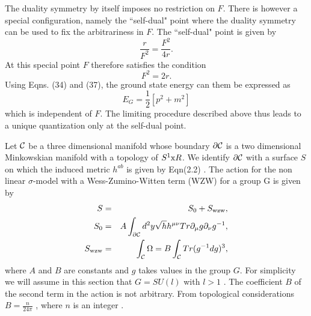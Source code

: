 \documentclass[a4paper,12pt]{article}
\let\oldtheequation=\theequation
\def\doteqs#1{\setcounter{equation}{0}
            \def\theequation{{#1}.\oldtheequation}}
\newcounter{sxn}
\def\sx#1{\addtocounter{sxn}{1} \bigskip\medskip \goodbreak
\noindent{\large\bf
\centerline{\thesxn.~~#1}} \nobreak \medskip}
\def\sxn#1{\sx{#1} \doteqs{\thesxn}}
\begin{document}
The duality symmetry by itself imposes no restriction on $F$.
 There is however a special configuration,
namely the ``self-dual" point where the duality symmetry can be used to
fix the arbitrariness in $F$. The ``self-dual" point is given by
\begin{equation}
\frac{r}{F^2} = \frac{F^2}{4 r}.
\end{equation}
At this special point $F$ therefore satisfies the condition
\begin{equation}
F^2 = 2 r.
\end{equation}
Using Eqns. (34) and (37), the ground state energy can them be expressed as 
\begin{equation}
E_G=\frac{1}{2}[p^2 + m^2]
\end{equation}
which is independent of $F$.
The limiting procedure described above thus leads to a unique 
quantization only at the self-dual point.


\sxn{Non Linear ${\sigma}$ - Model}

Let ${\cal C} $ be a three dimensional manifold whose boundary 
$ {{\partial}{\cal C}} $ is a two dimensional Minkowskian manifold with
a topology of $S^1 {\rm x} R$. We identify $ {{\partial}{\cal C}} $ 
with a surface $S$ on which the induced metric $h^{ab}$ is given by Eqn(2.2) . 
The action for the non linear $\sigma$-model with a
Wess-Zumino-Witten term (WZW) \cite{witten}  for a group G is given by
\begin{eqnarray}
S&=&S_0+S_{\rm wzw},\nonumber\\
S_0&=&A\int_{{\partial}{\cal C}} d^2y 
{\sqrt{h}}h^{{\mu}{\nu}}Tr{\partial}_{\mu} g {\partial}_{\nu}g^{-1},\nonumber\\
S_{\rm wzw}&=&\int_{\cal C}{\Omega}=B \int_{\cal C} Tr(g^{-1}dg)^3,
\end{eqnarray} 
where $A$ and $B$ are constants and $g$ takes values in the group $G$.
For simplicity we will assume in this section that $G=SU(l)$ with $l>1$ . 
The coefficient $B$ of the second term in the action is not arbitrary. 
From topological considerations $B = \frac{n}{24 \pi}$ ,
where $n$ is an integer \cite{witten}.
\end{document}
